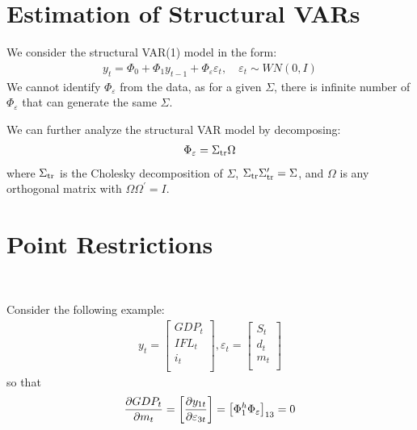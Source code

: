 \section{Estimation of Structural VARs}
\label{sec:estimation-structural-var}

We  consider the structural VAR(1) model in the form:
\begin{gather*}
    y_t = \Phi_0 + \Phi_1 y_{t-1} + \Phi_{\varepsilon} \varepsilon_t, \quad \varepsilon_t \sim WN(0, I)
\end{gather*}
We cannot identify $\Phi_\varepsilon$ from the data, as for a given $\Sigma$, there is infinite number of $\Phi_\varepsilon$ that can generate the same $\Sigma$.

We can further analyze the structural VAR model by decomposing:
\begin{gather*}
    \Phi_{\varepsilon} = \Sigma_{\operatorname{tr}} \Omega
\end{gather*}
where $\Sigma_{\operatorname{tr}}$ is the Cholesky decomposition of $\Sigma$, $\Sigma_{\operatorname{tr}} \Sigma_{\operatorname{tr}}^{\prime} = \Sigma$,
and $\Omega$ is any orthogonal matrix with $\Omega \Omega^{\prime} = I.$

\section{Point Restrictions}
\label{sec:point-restrictions}

\begin{eg}
    \

    Consider the following example:
    \begin{gather*}
        y_t = \begin{bmatrix}
             GDP_t \\
             IFL_t \\
             i_t \\
        \end{bmatrix}, \varepsilon_t = \begin{bmatrix}
             S_t \\
             d_t \\
             m_t \\
        \end{bmatrix}
    \end{gather*}
    so that
    \begin{gather*}
        \frac{\partial GDP_t}{\partial m_t} = \left[ \frac{\partial y_{1t}}{\partial \varepsilon_{3t}} \right] = \left[\Phi_1^h \Phi_\varepsilon \right]_{13} = 0
    \end{gather*}
\end{eg}